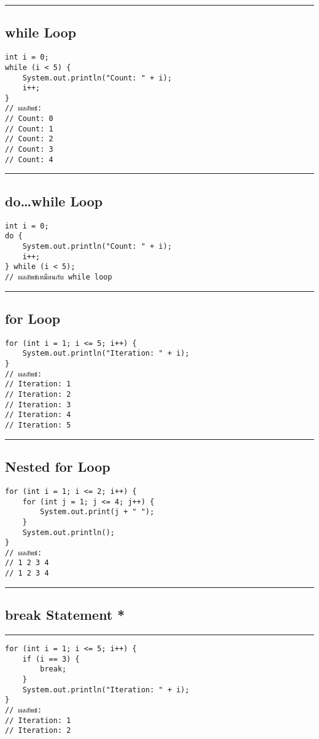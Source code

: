 \documentclass[11pt]{article}
\begin{document}
\noindent\rule{\textwidth}{0.5pt}
\subsection{while Loop}
\label{sec:orgd1f3c6c}
\begin{verbatim}
int i = 0;
while (i < 5) {
    System.out.println("Count: " + i);
    i++;
}
// ผลลัพธ์:
// Count: 0
// Count: 1
// Count: 2
// Count: 3
// Count: 4
\end{verbatim}

\noindent\rule{\textwidth}{0.5pt}
\subsection{do\ldots{}while Loop}
\label{sec:org813210a}
\begin{verbatim}
int i = 0;
do {
    System.out.println("Count: " + i);
    i++;
} while (i < 5);
// ผลลัพธ์เหมือนกับ while loop
\end{verbatim}

\noindent\rule{\textwidth}{0.5pt}
\subsection{for Loop}
\label{sec:org6f2c711}
\begin{verbatim}
for (int i = 1; i <= 5; i++) {
    System.out.println("Iteration: " + i);
}
// ผลลัพธ์:
// Iteration: 1
// Iteration: 2
// Iteration: 3
// Iteration: 4
// Iteration: 5
\end{verbatim}

\noindent\rule{\textwidth}{0.5pt}
\subsection{Nested for Loop}
\label{sec:orgd476b72}
\begin{verbatim}
for (int i = 1; i <= 2; i++) {
    for (int j = 1; j <= 4; j++) {
        System.out.print(j + " ");
    }
    System.out.println();
}
// ผลลัพธ์:
// 1 2 3 4
// 1 2 3 4
\end{verbatim}

\noindent\rule{\textwidth}{0.5pt}
\subsection{break Statement *}
\label{sec:orgfc4dee0}
\noindent\rule{\textwidth}{0.5pt}
\begin{verbatim}
for (int i = 1; i <= 5; i++) {
    if (i == 3) {
        break;
    }
    System.out.println("Iteration: " + i);
}
// ผลลัพธ์:
// Iteration: 1
// Iteration: 2
\end{verbatim}
\end{document}
